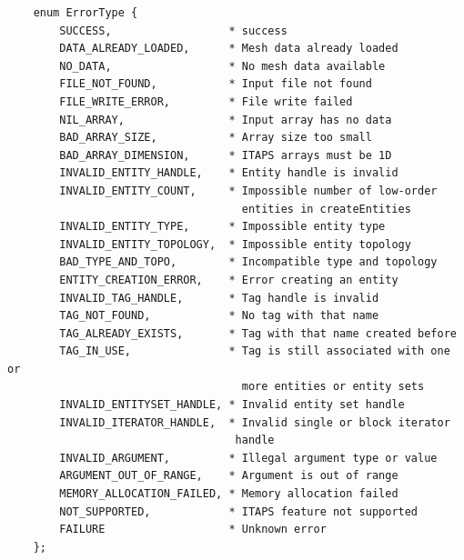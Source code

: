 \documentclass{article}
\begin{document}
\begin{verbatim}
    enum ErrorType {
        SUCCESS,                  * success 
        DATA_ALREADY_LOADED,      * Mesh data already loaded
        NO_DATA,                  * No mesh data available 
        FILE_NOT_FOUND,           * Input file not found
        FILE_WRITE_ERROR,         * File write failed
        NIL_ARRAY,                * Input array has no data
        BAD_ARRAY_SIZE,           * Array size too small 
        BAD_ARRAY_DIMENSION,      * ITAPS arrays must be 1D
        INVALID_ENTITY_HANDLE,    * Entity handle is invalid 
        INVALID_ENTITY_COUNT,     * Impossible number of low-order
                                    entities in createEntities 
        INVALID_ENTITY_TYPE,      * Impossible entity type 
        INVALID_ENTITY_TOPOLOGY,  * Impossible entity topology 
        BAD_TYPE_AND_TOPO,        * Incompatible type and topology 
        ENTITY_CREATION_ERROR,    * Error creating an entity 
        INVALID_TAG_HANDLE,       * Tag handle is invalid  
        TAG_NOT_FOUND,            * No tag with that name 
        TAG_ALREADY_EXISTS,       * Tag with that name created before
        TAG_IN_USE,               * Tag is still associated with one or
                                    more entities or entity sets
        INVALID_ENTITYSET_HANDLE, * Invalid entity set handle 
        INVALID_ITERATOR_HANDLE,  * Invalid single or block iterator
                                   handle  
        INVALID_ARGUMENT,         * Illegal argument type or value
        ARGUMENT_OUT_OF_RANGE,    * Argument is out of range  
        MEMORY_ALLOCATION_FAILED, * Memory allocation failed 
        NOT_SUPPORTED,            * ITAPS feature not supported
        FAILURE                   * Unknown error
    };
\end{verbatim}
\end{document}
